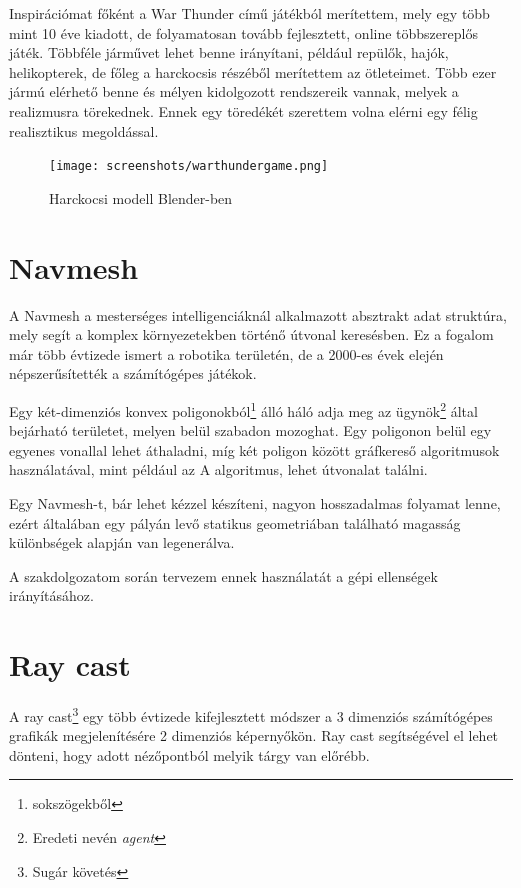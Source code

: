 \documentclass[
]{thesis-ekf}
\theoremstyle{definition}
\theoremstyle{remark}
\begin{document}
Inspirációmat főként a War Thunder\cite{warthunder} című játékból merítettem, mely egy több mint 10 éve kiadott, de folyamatosan tovább fejlesztett, online többszereplős játék. Többféle járművet lehet benne irányítani, például repülők, hajók, helikopterek, de főleg a harckocsis részéből merítettem az ötleteimet. Több ezer jármú elérhető benne és mélyen kidolgozott rendszereik vannak, melyek a realizmusra törekednek. Ennek egy töredékét szerettem volna elérni egy félig realisztikus megoldással.


\begin{figure}[H]
    \centering
    \texttt{[image: screenshots/warthundergame.png]}
    \caption{Harckocsi modell Blender-ben}
    \label{fig:warthundergame}
\end{figure}


\section{Navmesh}

A Navmesh\cite{navmesh} a mesterséges intelligenciáknál alkalmazott absztrakt adat struktúra, mely segít a komplex környezetekben történő útvonal keresésben. Ez a fogalom már több évtizede ismert a robotika területén, de a 2000-es évek elején népszerűsítették a számítógépes játékok.

Egy két-dimenziós konvex poligonokból\footnote{sokszögekből} álló háló adja meg az ügynök\footnote{Eredeti nevén \emph{agent}} által bejárható területet, melyen belül szabadon mozoghat. Egy poligonon belül egy egyenes vonallal lehet áthaladni, míg két poligon között gráfkereső algoritmusok használatával, mint például az A\* algoritmus, lehet útvonalat találni.

Egy Navmesh-t, bár lehet kézzel készíteni, nagyon hosszadalmas folyamat lenne, ezért általában egy pályán levő statikus geometriában található magasság különbségek alapján van legenerálva.

A szakdolgozatom során tervezem ennek használatát a gépi ellenségek irányításához.

\section{Ray cast}

A ray cast\cite{raycast}\footnote{Sugár követés} egy több évtizede kifejlesztett módszer a 3 dimenziós számítógépes grafikák megjelenítésére 2 dimenziós képernyőkön. Ray cast segítségével el lehet dönteni, hogy adott nézőpontból melyik tárgy van előrébb.
\end{document}
